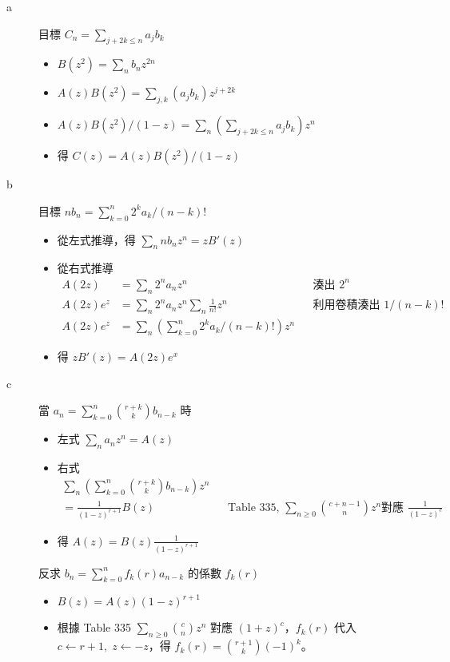 \documentclass[11pt,fleqn]{article}
\begin{document}
\begin{description}
	\item[a]
		目標 $C_n = \sum_{j+2k \le n} a_j b_k$
		\begin{itemize}
			\item $B(z^2) = \sum_n b_n z^{2n}$
			\item $A(z) B(z^2) = \sum_{j,k} (a_j b_k) z^{j+2k}$
			\item $A(z) B(z^2) / (1-z) = \sum_n (\sum_{j+2k \le n} a_j b_k) z^n$
			\item 得 $C(z) = A(z) B(z^2) / (1-z)$
		\end{itemize}
	\item[b]
		目標 $n b_n = \sum_{k=0}^{n} 2^k a_k / (n-k)!$
		\begin{itemize}
			\item 從左式推導，得 $\sum_n n b_n z^n = z B'(z)$
			\item 從右式推導
				\begin{align*}
					A(2z) &= \sum_n 2^n a_n z^n && \text{湊出 } 2^n\\
					A(2z) e^z &= \sum_n 2^n a_n z^n \sum_n \frac{1}{n!} z^n && \text{利用卷積湊出 } 1/(n-k)!\\
					A(2z) e^z &= \sum_n (\sum_{k=0}^n 2^k a_k /(n-k)!) z^n
				\end{align*}
			\item 得 $z B'(z) = A(2z) e^x$
		\end{itemize}
	\item[c]
		當 $a_n = \sum_{k=0}^{n} \binom{r+k}{k} b_{n-k}$ 時
		\begin{itemize}
			\item 左式 $\sum_n a_n z^n = A(z)$
			\item 右式 
				\begin{align*}
					\sum_n ( \sum_{k=0}^{n} \binom{r+k}{k} b_{n-k}) z^n \\
						= \frac{1}{(1-z)^{r+1}} B(z) && \text{Table 335, }
							\sum_{n \ge 0} \binom{c+n-1}{n} z^n \text{對應 }
							\frac{1}{(1-z)^c}
				\end{align*}
			\item 得 $A(z) = B(z) \frac{1}{(1-z)^{r+1}}$
		\end{itemize}
		反求 $b_n = \sum_{k=0}^{n} f_k(r) a_{n-k}$ 的係數 $f_k(r)$
		\begin{itemize}
			\item $B(z) = A(z) (1-z)^{r+1}$
			\item 根據 Table 335 $\sum_{n \ge 0} \binom{c}{n} z^n$ 對應 $(1+z)^c$，$f_k(r)$ 代入 $c \leftarrow r+1, \; z \leftarrow -z$，得 $f_k(r) = \binom{r+1}{k} (-1)^k$。
		\end{itemize}
\end{description}
\end{document}
